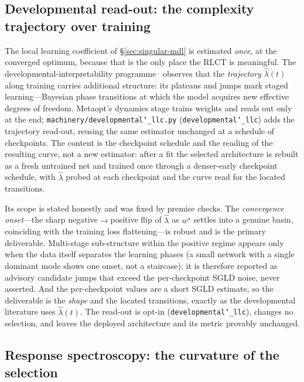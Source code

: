 \documentclass[11pt]{article}
\newcommand{\allowbreakhere}{\discretionary{}{}{}}
\newcommand{\code}[1]{\texttt{\def\_{\char`_\allowbreakhere}#1}}
\begin{document}
\subsection{Developmental read-out: the complexity trajectory over training}
\label{sec:developmental}

The local learning coefficient of \S\ref{sec:singular-mdl} is estimated \emph{once}, at the converged
optimum, because that is the only place the RLCT is meaningful. The developmental-interpretability
programme~\cite{hoogland2024devland} observes that the \emph{trajectory} $\hat\lambda(t)$ along training
carries additional structure: its plateaus and jumps mark staged learning---Bayesian phase transitions at
which the model acquires new effective degrees of freedom. Metaopt's dynamics stage trains weights and
reads out only at the end; \code{machinery/developmental\_llc.py} (\code{developmental\_llc}) adds the
trajectory read-out, reusing the same estimator unchanged at a schedule of checkpoints. The content is the
checkpoint schedule and the reading of the resulting curve, not a new estimator: after a fit the selected
architecture is rebuilt as a fresh untrained net and trained once through a denser-early checkpoint
schedule, with $\hat\lambda$ probed at each checkpoint and the curve read for the located transitions.

Its scope is stated honestly and was fixed by premise checks. The \emph{convergence onset}---the sharp
neg\-ative$\to$positive flip of $\hat\lambda$ as $w^\star$ settles into a genuine basin, coinciding with the
training loss flattening---is robust and is the primary deliverable. Multi-stage sub-structure within the
positive regime appears only when the data itself separates the learning phases (a small network with a
single dominant mode shows one onset, not a staircase); it is therefore reported as advisory candidate
jumps that exceed the per-checkpoint SGLD noise, never asserted. And the per-checkpoint values are a short
SGLD estimate, so the deliverable is the \emph{shape} and the located transitions, exactly as the
developmental literature uses $\hat\lambda(t)$. The read-out is opt-in (\code{developmental\_llc}), changes
no selection, and leaves the deployed architecture and its metric provably unchanged.

\subsection{Response spectroscopy: the curvature of the selection}
\label{sec:response}
\end{document}

